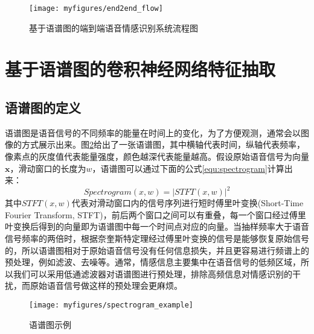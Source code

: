 \begin{figure}[htb] %
    \vspace{-0.8cm}  %
    \setlength{\belowcaptionskip}{0cm}   %
    \centering
    \texttt{[image: myfigures/end2end\_flow]}
    \caption{基于语谱图的端到端语音情感识别系统流程图}
    \label{fig:end2end_flow}
\end{figure}

\section{基于语谱图的卷积神经网络特征抽取}
\label{sec:cnn_spectrogram_feature}

\subsection{语谱图的定义}
\label{ssec:spectrogram}

语谱图是语音信号的不同频率的能量在时间上的变化，为了方便观测，通常会以图像的方式展示出来。图\ref{fig:spectrogram_example}给出了一张语谱图，其中横轴代表时间，纵轴代表频率，像素点的灰度值代表能量强度，颜色越深代表能量越高。假设原始语音信号为向量$\mathbf{x}$，滑动窗口的长度为$w$，语谱图可以通过下面的公式\ref{equ:spectrogram}计算出来：
\begin{equation}
\label{equ:spectrogram}
    Spectrogram(x, w) = |STFT(x, w)|^2
\end{equation}
其中$STFT(x, w)$代表对滑动窗口内的信号序列进行短时傅里叶变换(Short-Time Fourier Transform, STFT)，前后两个窗口之间可以有重叠，每一个窗口经过傅里叶变换后得到的向量即为语谱图中每一个时间点对应的向量。当抽样频率大于语音信号频率的两倍时，根据奈奎斯特定理经过傅里叶变换的信号是能够恢复原始信号的，所以语谱图相对于原始语音信号没有任何信息损失，并且更容易进行频谱上的预处理，例如滤波、去噪等。通常，情感信息主要集中在语音信号的低频区域，所以我们可以采用低通滤波器对语谱图进行预处理，排除高频信息对情感识别的干扰，而原始语音信号做这样的预处理会更麻烦。

\begin{figure}[htb] %
    \vspace{-0.8cm}  %
    \setlength{\abovecaptionskip}{-0.5cm}
    \setlength{\belowcaptionskip}{0cm}   %
    \centering
    \texttt{[image: myfigures/spectrogram\_example]}
    \caption{语谱图示例}
    \label{fig:spectrogram_example}
\end{figure}

